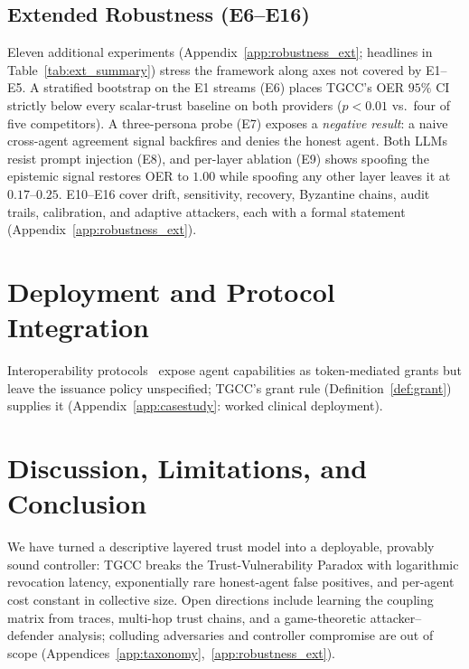 \documentclass[sigconf,anonymous]{acmart}
\theoremstyle{plain}
\theoremstyle{definition}
\theoremstyle{remark}
\begin{document}
\subsection{Extended Robustness (E6--E16)}
\label{sec:exp_ext}
Eleven additional experiments (Appendix~\ref{app:robustness_ext};
headlines in Table~\ref{tab:ext_summary}) stress the framework along
axes not covered by E1--E5.  A stratified bootstrap on the E1 streams
(E6) places TGCC's OER $95\%$ CI strictly below every scalar-trust
baseline on both providers ($p<0.01$ vs.\ four of five competitors).
A three-persona probe (E7) exposes a \emph{negative result}: a naive
cross-agent agreement signal backfires and denies the honest agent.
Both LLMs resist prompt injection (E8), and per-layer ablation (E9)
shows spoofing the epistemic signal restores OER to $1.00$ while
spoofing any other layer leaves it at $0.17$--$0.25$.  E10--E16
cover drift, sensitivity, recovery, Byzantine chains, audit trails,
calibration, and adaptive attackers, each with a formal statement
(Appendix~\ref{app:robustness_ext}).

\section{Deployment and Protocol Integration}
\label{sec:discussion}
Interoperability protocols~\cite{mcp2024,a2a2025,interop2025} expose
agent capabilities as token-mediated grants but leave the issuance
policy unspecified; TGCC's grant rule (Definition~\ref{def:grant})
supplies it (Appendix~\ref{app:casestudy}: worked clinical
deployment).

\section{Discussion, Limitations, and Conclusion}
\label{sec:disc_open}
We have turned a descriptive layered trust model into a deployable, provably
sound controller: TGCC breaks the Trust-Vulnerability Paradox with
logarithmic revocation latency, exponentially rare honest-agent false
positives, and per-agent cost constant in collective size. Open directions
include learning the coupling matrix from traces, multi-hop trust chains,
and a game-theoretic attacker--defender analysis; colluding adversaries and
controller compromise are out of scope
(Appendices~\ref{app:taxonomy},~\ref{app:robustness_ext}).
\end{document}
